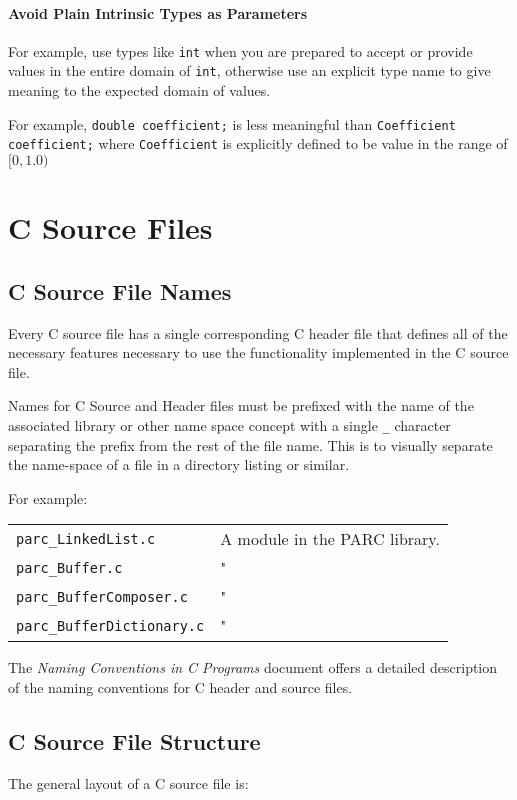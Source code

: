 \documentclass[fleqn,12pt]{PARCOneColumn} %
\begin{document}
\paragraph{Avoid Plain Intrinsic Types as Parameters}
For example, use types like {\tt int} when you are prepared to accept or provide values in the entire domain of {\tt int}, otherwise use an explicit type name to give meaning to the expected domain of values.

For example, {\tt double coefficient;} is less meaningful than {\tt Coefficient coefficient;}
where {\tt Coefficient} is explicitly defined to be value in the range of $[0, 1.0)$

\section{C Source Files}

\subsection{C Source File Names}
Every C source file has a single corresponding C header file that defines all of the necessary features necessary to use the functionality implemented in the C source file.

Names for C Source and Header files must be prefixed with the name of the
associated library or other name space concept with a single {\tt \_} character separating the prefix from the rest of the file name.
This is to visually separate the name-space of a file in a directory listing or similar.

For example:\hfil\break
\begin{tabular}{ l l }
\hline              
	{\tt parc\_LinkedList.c} & A module in the PARC library. \\
	{\tt parc\_Buffer.c}            & " \\
	{\tt parc\_BufferComposer.c}    & " \\
	{\tt parc\_BufferDictionary.c}  & " \\
\end{tabular}

The \textit{Naming Conventions in C Programs} document offers a detailed description of the naming conventions for C header and source files.

\subsection{C Source File Structure}
The general layout of a C source file is:
\end{document}
